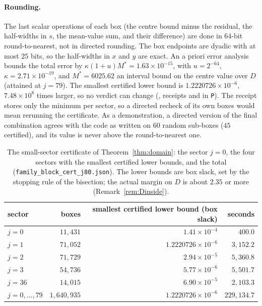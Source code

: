 \documentclass[11pt]{article}
\theoremstyle{definition}
\theoremstyle{remark}
\begin{document}
\paragraph{Rounding.} The last scalar operations of each box (the centre bound minus the residual, the half-widths in
$s$, the mean-value sum, and their difference) are done in $64$-bit round-to-nearest, not in directed rounding. The box
endpoints are dyadic with at most $25$ bits, so the half-widths in $x$ and $y$ are exact. An a priori error analysis
bounds the total error by $\kappa(1+u)M^*=1.63\times10^{-15}$, with $u=2^{-64}$, $\kappa=2.71\times10^{-19}$, and
$M^*=6025.62$ an interval bound on the centre value over $D$ (attained at $j=79$). The smallest certified lower bound is
$1.2220726\times10^{-6}$, $7.48\times10^8$ times larger, so no verdict can change
(, receipts  and 
in \texttt{P}). The receipt stores only the minimum per sector, so a directed recheck of its own boxes would mean
rerunning the certificate. As a demonstration, a directed version of the final combination agrees with the code as
written on $60$ random sub-boxes ($45$ certified), and its value is never above the round-to-nearest one.

\begin{table}[ht]\centering\small
\caption{The small-sector certificate of Theorem~\ref{thm:domain}: the sector $j=0$, the four sectors with the
smallest certified lower bounds, and the total (\texttt{family\_block\_cert\_j80.json}). The lower bounds are box
slack, set by the stopping rule of the bisection; the actual margin on $D$ is about $2.35$ or more
(Remark~\ref{rem:Dinside}).}\label{tab:domain}
\begin{tabular}{lrrr}\toprule
sector & boxes & smallest certified lower bound (box slack) & seconds\\ \midrule
$j=0$ & $11{,}431$ & $1.41\times10^{-4}$ & $400.0$\\
$j=1$ & $71{,}052$ & $1.2220726\times10^{-6}$ & $3{,}152.2$\\
$j=2$ & $71{,}729$ & $2.94\times10^{-5}$ & $5{,}360.8$\\
$j=3$ & $54{,}736$ & $5.77\times10^{-6}$ & $5{,}501.7$\\
$j=36$ & $14{,}015$ & $6.90\times10^{-5}$ & $2{,}103.3$\\ \midrule
$j=0,\dots,79$ & $1{,}640{,}935$ & $1.2220726\times10^{-6}$ & $229{,}134.7$\\
\bottomrule\end{tabular}
\end{table}
\end{document}
